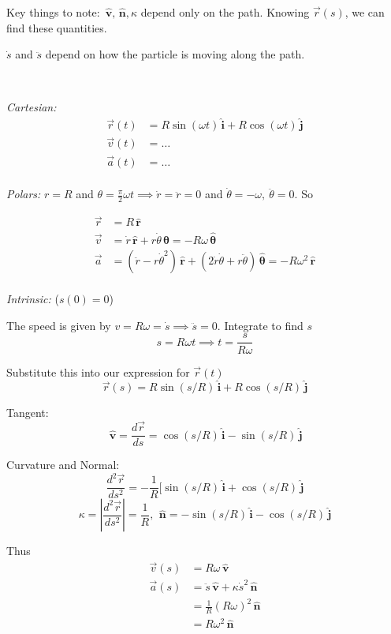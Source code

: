 \documentclass[twoside]{scrartcl}
\let\oldhat\hat
\renewcommand{\hat}[1]{\,\oldhat{\boldsymbol{\mathbf{#1}}}}
\begin{document}
Key things to note: $\hat{v}, \hat{n}, \kappa$ depend only on the path. Knowing $\vec{r}(s)$, we can find these 	quantities. 

$\dot{s}$ and $\ddot{s}$ depend on how the particle is moving along the path.

\pagebreak


\begin{example}~

\emph{Cartesian:}
\[\begin{aligned}
\vec{r}(t) &= R\sin(\omega t)\hat{i} + R\cos(\omega t)\hat{j}\\
\vec{v}(t) &= \dots\\
\vec{a}(t) &= \dots
\end{aligned}
\]~\\


\emph{Polars:} 
$r = R$ and $\theta = \frac{\pi}{2} \omega t \implies \dot{r} = \ddot{r} = 0$ and $ \dot{\theta} = -\omega,~\ddot{\theta} = 0$. So 

\[\begin{aligned}
	\vec{r} &= R\hat{r}\\
 \vec{v} &= \dot{r}\hat{r} + r\dot{\theta}\hat{\theta} = -R\omega\hat{\theta}\\
\vec{a} &= (\ddot{r} - r\dot{\theta}^2)\hat{r} + (2\dot{r}\dot{\theta} + r\ddot{\theta})\hat{\theta} = -R\omega^2\hat{r}
\end{aligned}
\]~\\


\emph{Intrinsic:} ($s(0) = 0$) 

The speed is given by $v = R\omega = \dot{s} \implies \ddot{s} = 0$. Integrate to find $s$
\[s = R\omega t \implies t= \frac{s}{R\omega}\]

Substitute this into our expression for $\vec{r}(t)$
\[\vec{r}(s) = R\sin(s/R)\hat{i} + R\cos(s/R)\hat{j}\]

Tangent: 
\[\hat{v} = \dfrac{d\vec{r}}{ds} = \cos(s/R)\hat{i} - \sin(s/R)\hat{j}\]

Curvature and Normal:
\[\dfrac{d^2\vec{r}}{ds^2} = -\dfrac{1}{R}[\sin(s/R)\hat{i} + \cos(s/R)\hat{j}\]
\[ \kappa = \left|\dfrac{d^2\vec{r}}{ds^2} \right| = \dfrac{1}{R},~ \hat{n} = -\sin(s/R)\hat{i} - \cos(s/R)\hat{j}\]

Thus
\[\begin{aligned}
\vec{v}(s) &= R\omega \hat{v}\\
\vec{a}(s) &= \ddot{s}\hat{v} + \kappa \dot{s}^2\hat{n}\\
& = \frac{1}{R}(R\omega)^2\hat{n}\\ &= R\omega^2\hat{n}
\end{aligned}
\]
\end{example}
\end{document}
